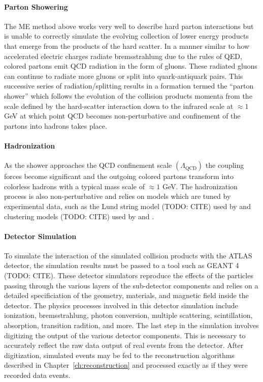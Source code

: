 \paragraph{\textbf{Parton Showering}}
The ME method above works very well to describe hard parton interactions but is unable to correctly simulate the evolving collection of lower energy products that emerge from the products of the hard scatter.
In a manner similar to how accelerated electric charges radiate bremsstrahlung due to the rules of QED, colored partons emit QCD radiation in the form of gluons.
These radiated gluons can continue to radiate more gluons or split into quark-antiquark pairs.
This successive series of radiation/splitting results in a formation termed the ``parton shower'' which follows the evolution of the collision products momenta from the scale defined by the hard-scatter interaction down to the infrared scale at $\approx 1$ GeV at which point QCD becomes non-perturbative and confinement of the partons into hadrons takes place.

\paragraph{\textbf{Hadronization}}
As the shower approaches the QCD confinement scale $(\Lambda_{\mathrm{QCD}})$ the coupling forces become significant and the outgoing colored partons transform into colorless hadrons with a typical mass scale of $\approx 1$ GeV.
The hadronization process is also non-perturbative and relies on models which are tuned by experimental data, such as the Lund string model (TODO: CITE) used by \Pythia and clustering models (TODO: CITE) used by \Herwig and \Sherpa.

\paragraph{\textbf{Detector Simulation}}
To simulate the interaction of the simulated collision products with the ATLAS detector, the simulation results must be passed to a tool such as GEANT 4 (TODO: CITE).
These detector simulators reproduce the effects of the particles passing through the various layers of the sub-detector components and relies on a detailed specificiation of the geometry, materials, and magnetic field inside the detector.
The physics processes involved in this detector simulation include ionization, bremsstrahlung, photon conversion, multiple scattering, scintillation, absorption, transition radition, and more.
The last step in the simulation involves digitizing the output of the various detector components.
This is necessary to accurately reflect the raw data output of real events from the detector.
After digitization, simulated events may be fed to the reconstruction algorithms described in Chapter~\ref{ch:reconstruction} and processed exactly as if they were recorded data events.

